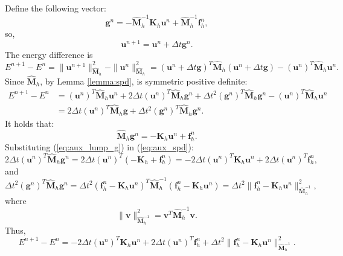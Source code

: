 \documentclass{article}
\renewcommand{\u}{\mathbf{u}}
\newcommand{\K}{\mathbf{K}_h}
\newcommand{\M}{\hat{\mathbf{M}}_h}
\begin{document}
Define the following vector:
\begin{equation}
    \nonumber
    \mathbf{g}^n = -\M^{-1}\K \u^n + \M^{-1}\mathbf{f}_h^n,
\end{equation}
so,
\begin{equation}
    \nonumber
    \u^{n+1} = \u^n + \Delta t \mathbf{g}^n.
\end{equation}
The energy difference is
\begin{equation}
    \nonumber
    E^{n+1}-E^n = \| \u^{n+1}\|^2_{\M} - \| \u^{n}\|^2_{\M} = (\u^n+\Delta t \mathbf{g})^T \M (\u^n + \Delta t \mathbf{g}) - (\u^n)^T\M \u^n.
\end{equation}
Since $\M$, by Lemma \ref{lemma:spd}, is symmetric positive definite:
\begin{equation}\label{eq:aux_spd}
    \begin{split}
        E^{n+1}-E^n &= (\u^n)^T\M \u^n + 2 \Delta t (\u^n)^T \M \mathbf{g}^n + \Delta t^2 (\mathbf{g}^n)^T \M \mathbf{g}^n - (\u^n)^T\M \u^n \\
        &= 2 \Delta t (\u^n)^T\M \mathbf{g} + \Delta t^2 (\mathbf{g}^n)^T \M \mathbf{g}^n.
    \end{split}
\end{equation}
It holds that:
\begin{equation}\label{eq:aux_lump_g}
    \M \mathbf{g}^n = - \K \u^n + \mathbf{f}^n_h.
\end{equation}
Substituting (\ref{eq:aux_lump_g}) in (\ref{eq:aux_spd}):
\begin{equation}
    \nonumber
    2 \Delta t (\u^n)^T \M \mathbf{g}^n = 2 \Delta t (\u^n)^T (-\K + \mathbf{f}^n_h) = -2 \Delta t (\u^n)^T \K \u^n + 2 \Delta t (\u^n)^T \mathbf{f}_h^n,
\end{equation}
and
\begin{equation}
    \nonumber
    \Delta t^2 (\mathbf{g}^n)^T \M \mathbf{g}^n = \Delta t^2 (\mathbf{f}_h^n - \K \u^n)^T \M^{-1} (\mathbf{f}_h^n - \K \u^n) = \Delta t^2 \| \mathbf{f}^n_h - \K \u^n \|^2_{\M^{-1}},
\end{equation}
where
\begin{equation}
    \nonumber
    \| \mathbf{v} \|^2_{\M^{-1}} = \mathbf{v}^T \M^{-1} \mathbf{v}.
\end{equation}
Thus,
\begin{equation}\label{eq:aux_energy_difference}
    \nonumber
    E^{n+1} - E^n = -2 \Delta t (\u^n)^T \K \u^n + 2 \Delta t (\u^n)^T \mathbf{f}_h^n + \Delta t^2 \| \mathbf{f}^n_h - \K \u^n \|^2_{\M^{-1}}.
\end{equation}
\end{document}

